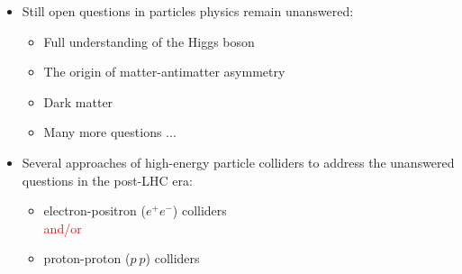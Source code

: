 \begin{frame}
      \begin{itemize}
  \item Still open questions in particles physics remain unanswered:
    \begin{itemize}
    \item Full understanding of the Higgs boson
    \item The origin of matter-antimatter asymmetry
    \item Dark matter
    \item Many more questions ...
    \end{itemize}

  \item Several approaches of high-energy particle colliders to
    address the unanswered questions in the post-LHC era:
    \begin{itemize}
    \item electron-positron ($e^+e^-$) colliders
      \\
      \textcolor{Red}{and/or}
      \\
    \item proton-proton ($p~p$) colliders
    \end{itemize}
  \end{itemize}

\end{frame}


